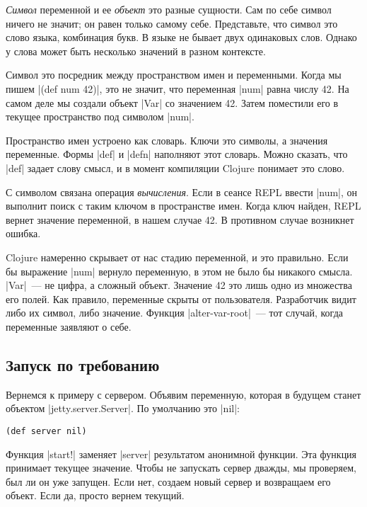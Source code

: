 \emph{Символ} переменной и ее \emph{объект} это разные сущности. Сам по себе
символ ничего не значит; он равен только самому себе. Представьте, что символ
это слово языка, комбинация букв. В языке не бывает двух одинаковых слов. Однако
у слова может быть несколько значений в разном контексте.

Символ это посредник между пространством имен и переменными. Когда мы пишем
\spverb|(def num 42)|, это не значит, что переменная \spverb|num| равна числу
42. На самом деле мы создали объект \spverb|Var| со значением 42. Затем
поместили его в текущее пространство под символом \spverb|num|.

Пространство имен устроено как словарь. Ключи это символы, а значения
переменные. Формы \spverb|def| и \spverb|defn| наполняют этот словарь. Можно
сказать, что \spverb|def| задает слову смысл, и в момент компиляции Clojure
понимает это слово.

С символом связана операция \emph{вычисления}. Если в сеансе REPL ввести
\spverb|num|, он выполнит поиск с таким ключом в пространстве имен. Когда ключ
найден, REPL вернет значение переменной, в нашем случае 42. В противном случае
возникнет ошибка.

Clojure намеренно скрывает от нас стадию переменной, и это правильно. Если бы
выражение \spverb|num| вернуло переменную, в этом не было бы никакого
смысла. \spverb|Var|~--- не цифра, а сложный объект. Значение 42 это лишь одно
из множества его полей. Как правило, переменные скрыты от
пользователя. Разработчик видит либо их символ, либо значение. Функция
\spverb|alter-var-root|~--- тот случай, когда переменные заявляют о себе.


\subsection{Запуск по требованию}

Вернемся к примеру с сервером. Объявим переменную, которая в будущем станет
объектом \spverb|jetty.server.Server|. По умолчанию это \spverb|nil|:

\begin{verbatim}
(def server nil)
\end{verbatim}

Функция \spverb|start!| заменяет \spverb|server| результатом анонимной функции. Эта функция
принимает текущее значение. Чтобы не запускать сервер дважды, мы проверяем, был
ли он уже запущен. Если нет, создаем новый сервер и возвращаем его объект. Если
да, просто вернем текущий.


